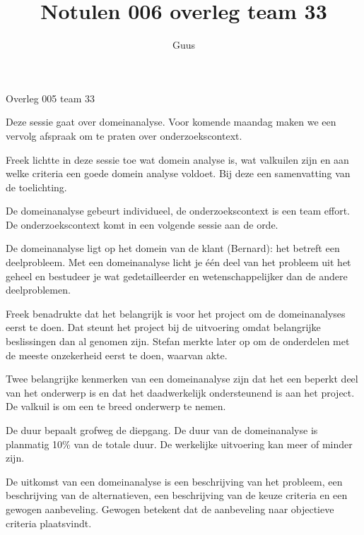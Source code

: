 \documentclass{article}
\title{Notulen 006 overleg team 33}
\author{Guus}
\begin{document}

\begin{Minutes}{Overleg 005 team 33}

\maketitle%


Deze sessie gaat over domeinanalyse. Voor komende maandag maken we een vervolg afspraak om te praten over onderzoekscontext.


Freek lichtte in deze sessie toe wat domein analyse is, wat valkuilen zijn en aan welke criteria een goede domein analyse voldoet. Bij deze een samenvatting
van de toelichting.

De domeinanalyse gebeurt individueel, de onderzoekscontext is een team effort. De onderzoekscontext komt in een volgende sessie aan de orde.

De domeinanalyse ligt op het domein van de klant (Bernard): het betreft een deelprobleem. Met een domeinanalyse licht je
\'e\'en deel van het probleem uit het geheel en bestudeer je wat gedetailleerder en wetenschappelijker dan de andere deelproblemen.

Freek benadrukte dat het belangrijk is voor het project om de domeinanalyses eerst te doen. Dat steunt het project bij de uitvoering omdat belangrijke beslissingen
dan al genomen zijn. Stefan merkte later op om de onderdelen met de meeste onzekerheid eerst te doen, waarvan akte.

Twee belangrijke kenmerken van een domeinanalyse zijn dat het een beperkt deel van het onderwerp is en dat het daadwerkelijk ondersteunend is aan het project.
De valkuil is om een te breed onderwerp te nemen.

De duur bepaalt grofweg de diepgang. De duur van de domeinanalyse is planmatig 10\% van de totale duur.
De werkelijke uitvoering kan meer of minder zijn.

De uitkomst van een domeinanalyse is een beschrijving van het probleem,
een beschrijving van de alternatieven, een beschrijving van de keuze criteria en een gewogen aanbeveling. Gewogen betekent dat de aanbeveling naar objectieve criteria plaatsvindt.


\end{Minutes}
\end{document}
